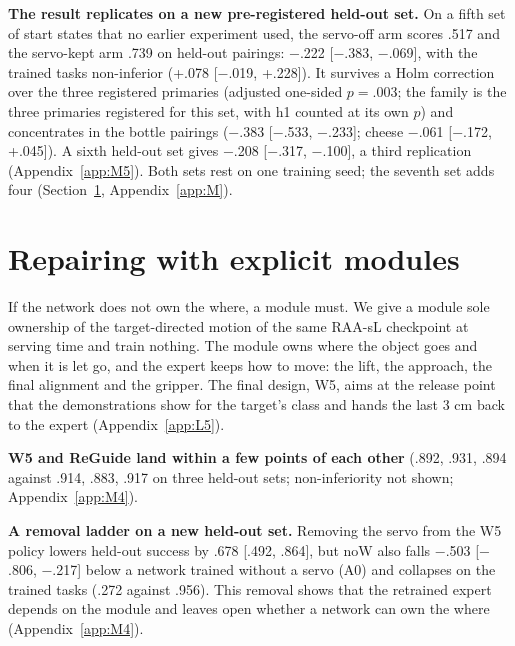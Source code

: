 \documentclass{article}
\newcommand{\mi}{$-$}
\begin{document}
\textbf{The result replicates on a new pre-registered held-out set.} On a fifth set of start states that no earlier experiment used, the servo-off arm scores .517 and the servo-kept arm .739 on held-out pairings: \mi.222 [\mi.383, \mi.069], with the trained tasks non-inferior (+.078 [\mi.019, +.228]). It survives a Holm correction over the three registered primaries (adjusted one-sided $p = .003$; the family is the three primaries registered for this set, with h1 counted at its own $p$) and concentrates in the bottle pairings (\mi.383 [\mi.533, \mi.233]; cheese \mi.061 [\mi.172, +.045]). A sixth held-out set gives \mi.208 [\mi.317, \mi.100], a third replication (Appendix~\ref{app:M5}). Both sets rest on one training seed; the seventh set adds four (Section~\ref{sec:modules}, Appendix~\ref{app:M}).

\section{Repairing with explicit modules}
\label{sec:modules}

If the network does not own the where, a module must. We give a module sole ownership of the target-directed motion of the same RAA-sL checkpoint at serving time and train nothing. The module owns where the object goes and when it is let go, and the expert keeps how to move: the lift, the approach, the final alignment and the gripper. The final design, W5, aims at the release point that the demonstrations show for the target's class and hands the last 3 cm back to the expert (Appendix~\ref{app:L5}).



\textbf{W5 and ReGuide land within a few points of each other} (.892, .931, .894 against .914, .883, .917 on three held-out sets; non-inferiority not shown; Appendix~\ref{app:M4}).


\textbf{A removal ladder on a new held-out set.} Removing the servo from the W5 policy lowers held-out success by .678 [.492, .864], but noW also falls \mi.503 [\mi.806, \mi.217] below a network trained without a servo (A0) and collapses on the trained tasks (.272 against .956). This removal shows that the retrained expert depends on the module and leaves open whether a network can own the where (Appendix~\ref{app:M4}).
\end{document}
